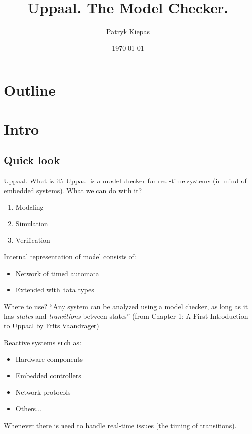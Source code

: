 \documentclass{beamer}
\title{Uppaal. The Model Checker.}
\author{Patryk Kiepas}
\date{\today}
\begin{document}
\begin{frame}
	\titlepage
\end{frame}

\section*{Outline}
\begin{frame}
	\tableofcontents
\end{frame}

\section{Intro}
\subsection{Quick look}
\begin{frame}{Uppaal. What is it?}
	Uppaal is a model checker for real-time systems (in mind of embedded systems). What we can do with it?
	
	\begin{enumerate}
		\item Modeling
		\item Simulation
		\item Verification
	\end{enumerate}
	
	Internal representation of model consists of:
	
	\begin{itemize}
		\item Network of timed automata
		\item Extended with data types
	\end{itemize}

\end{frame}

\begin{frame}{Where to use?}
	``Any system can be analyzed using a model checker, as long as it has \textit{states} and \textit{transitions} between states'' (from Chapter 1: A First Introduction to Uppaal by Frits Vaandrager) \newline
	
	Reactive systems such as:
	\begin{itemize}
		\item Hardware components
		\item Embedded controllers
		\item Network protocols
		\item Others...
	\end{itemize}
	Whenever there is need to handle real-time issues (the timing of transitions).
	
\end{frame}
\end{document}
